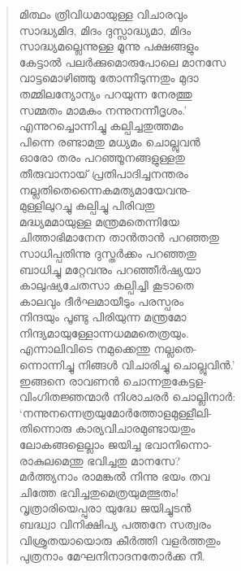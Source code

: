 \begin{verse}
മിത്ഥം ത്രിവിധമായുള്ള വിചാരവും\\
സാദ്ധ്യമിദ, മിദം ദുസ്സാദ്ധ്യമാ, മിദം\\
സാദ്ധ്യമല്ലെന്നുള്ള മൂന്നു പക്ഷങ്ങളും\\
കേട്ടാല്‍ പലര്‍ക്കുമൊരുപോലെ മാനസേ\\
വാട്ടമൊഴിഞ്ഞു തോന്നീടുന്നതും മുദാ\\
തമ്മിലന്യോന്യം പറയുന്ന നേരത്തു\\
സമ്മതം മാമകം നന്നുനന്നീദൃശം.’\\
എന്നുറച്ചൊന്നിച്ചു കല്പിച്ചതുത്തമം\\
പിന്നെ രണ്ടാമതു മധ്യമം ചൊല്ലുവന്‍\\
ഓരോ തരം പറഞ്ഞൂനങ്ങളുള്ളതു\\
തീരുവാനായ് പ്രതിപാദിച്ചനന്തരം\\
നല്ലതിതെന്നൈകമത്യമായേവനു-\\
മുള്ളിലുറച്ചു കല്പിച്ചു പിരിവതു\\
മദ്ധ്യമമായുള്ള മന്ത്രമതെന്നിയേ\\
ചിത്താഭിമാനേന താന്‍താന്‍ പറഞ്ഞതു\\
സാധിപ്പതിന്നു ദുസ്തര്‍ക്കം പറഞ്ഞതു\\
ബാധിച്ചു മറ്റേവനും പറഞ്ഞീര്‍ഷ്യയാ\\
കാലുഷ്യചേതസാ കല്പിച്ചി കൂടാതെ\\
കാലവും ദീര്‍ഘമായീടും പരസ്പരം\\
നിന്ദയും പൂണ്ടു പിരിയുന്ന മന്ത്രമോ\\
നിന്ദ്യമായുള്ളോന്നധമമതെത്രയും.\\
എന്നാലിവിടെ നമുക്കെന്തു നല്ലതെ-\\
ന്നൊന്നിച്ചു നിങ്ങള്‍ വിചാരിച്ചു ചൊല്ലുവിന്‍.’\\
ഇങ്ങനെ രാവണന്‍ ചൊന്നതുകേട്ടള-\\
വിംഗിതജ്ഞന്മാര്‍ നിശാചരര്‍ ചൊല്ലിനാര്‍:\\
‘നന്നുനന്നെത്രയുമോര്‍ത്തോളമുള്ളീലി-\\
തിന്നൊരു കാര്യവിചാരമുണ്ടായതും\\
ലോകങ്ങളെല്ലാം ജയിച്ച ഭവാനിന്നൊ-\\
രാകുലമെന്തു ഭവിച്ചതു മാനസേ?\\
മര്‍ത്ത്യനാം രാമങ്കല്‍ നിന്നു ഭയം തവ\\
ചിത്തേ ഭവിച്ചതുമെത്രയുമത്ഭുതം!\\
വൃത്രാരിയെപ്പുരാ യുദ്ധേ ജയിച്ചുടന്‍\\
ബദ്ധ്വാ വിനിക്ഷിപ്യ പത്തനേ സത്വരം\\
വിശ്രുതയായൊരു കീര്‍ത്തി വളര്‍ത്തതും\\
പുത്രനാം മേഘനിനാദനതോര്‍ക്ക നീ.\\

\end{verse}
